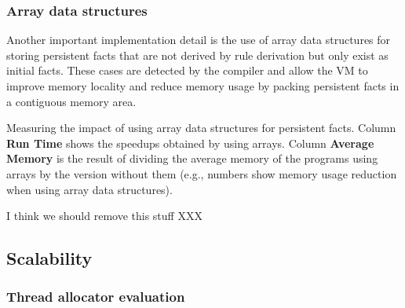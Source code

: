 \subsubsection{Array data structures}

Another important implementation detail is the use of array data structures for
storing persistent facts that are not derived by rule derivation but only exist
as initial facts. These cases are detected by the compiler and allow the VM to
improve memory locality and reduce memory usage by packing persistent facts in a
contiguous memory area.

\begin{table}[ht]
   \begin{center}
      
   \end{center}

   \caption{Measuring the impact of using array data structures for persistent
      facts. Column \textbf{Run Time} shows the speedups obtained by using
      arrays. Column \textbf{Average Memory} is the result of dividing the
      average memory of the programs using arrays by the version without them
      (e.g., numbers show memory usage reduction when using array data
   structures).}

   \label{table:implementation:compare_arrays}
\end{table}

I think we should remove this stuff XXX

\subsection{Scalability}

\subsubsection{Thread allocator evaluation}

